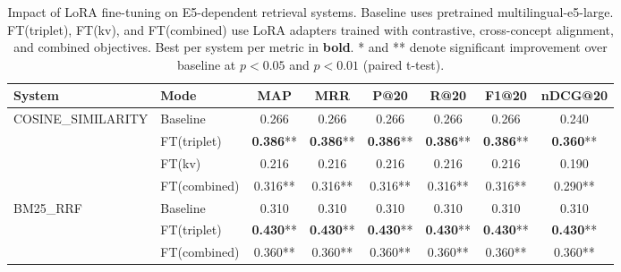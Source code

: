 \begin{table}[t]
\centering
\caption{Impact of LoRA fine-tuning on E5-dependent retrieval systems. Baseline uses pretrained \mbox{multilingual-e5-large}. FT(triplet), FT(kv), and FT(combined) use LoRA adapters trained with contrastive, cross-concept alignment, and combined objectives. Best per system per metric in \textbf{bold}. * and ** denote significant improvement over baseline at $p<0.05$ and $p<0.01$ (paired t-test).}
\label{tab:finetune-comparison}
\small
\begin{tabular}{llcccccc}
\toprule
\textbf{System} & \textbf{Mode} & \textbf{MAP} & \textbf{MRR} & \textbf{P@20} & \textbf{R@20} & \textbf{F1@20} & \textbf{nDCG@20} \\
\midrule
COSINE\_SIMILARITY & Baseline & 0.266 & 0.266 & 0.266 & 0.266 & 0.266 & 0.240 \\
 & FT(triplet) & \textbf{0.386}** & \textbf{0.386}** & \textbf{0.386}** & \textbf{0.386}** & \textbf{0.386}** & \textbf{0.360}** \\
 & FT(kv) & 0.216 & 0.216 & 0.216 & 0.216 & 0.216 & 0.190 \\
 & FT(combined) & 0.316** & 0.316** & 0.316** & 0.316** & 0.316** & 0.290** \\
\midrule
BM25\_RRF & Baseline & 0.310 & 0.310 & 0.310 & 0.310 & 0.310 & 0.310 \\
 & FT(triplet) & \textbf{0.430}** & \textbf{0.430}** & \textbf{0.430}** & \textbf{0.430}** & \textbf{0.430}** & \textbf{0.430}** \\
 & FT(combined) & 0.360** & 0.360** & 0.360** & 0.360** & 0.360** & 0.360** \\
\bottomrule
\end{tabular}
\end{table}